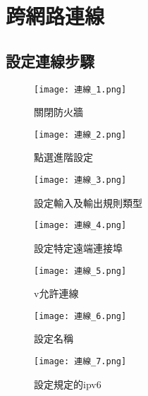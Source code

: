 \chapter{跨網路連線}
\section{設定連線步驟}
\begin{figure}[hbt!]
  \begin{center}
    \texttt{[image: 連線\_1.png]}
  \end{center}
  \caption{關閉防火牆}
  \label{fig:photo}
\end{figure}

\begin{figure}[hbt!]
  \begin{center}
    \texttt{[image: 連線\_2.png]}
  \end{center}
  \caption{點選進階設定}
  \label{fig:photo}
\end{figure}

\begin{figure}[hbt!]
  \begin{center}
    \texttt{[image: 連線\_3.png]}
  \end{center}
  \caption{設定輸入及輸出規則類型}
  \label{fig:photo}
\end{figure}

\begin{figure}[hbt!]
  \begin{center}
    \texttt{[image: 連線\_4.png]}
  \end{center}
  \caption{設定特定遠端連接埠}
  \label{fig:photo}
\end{figure}

\begin{figure}[hbt!]
  \begin{center}
    \texttt{[image: 連線\_5.png]}
  \end{center}
  \caption{v允許連線}
  \label{fig:photo}
\end{figure}

\begin{figure}[hbt!]
  \begin{center}
    \texttt{[image: 連線\_6.png]}
  \end{center}
  \caption{設定名稱}
  \label{fig:photo}
\end{figure}

\begin{figure}[hbt!]
  \begin{center}
    \texttt{[image: 連線\_7.png]}
  \end{center}
  \caption{設定規定的ipv6}
  \label{fig:photo}
\end{figure}

